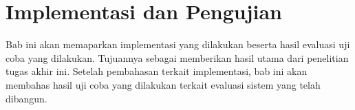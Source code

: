 \chapter{Implementasi dan Pengujian}
\label{chapter:implementasi-dan-pengujian}
Bab ini akan memaparkan implementasi yang dilakukan beserta hasil evaluasi uji coba yang dilakukan. Tujuannya sebagai memberikan hasil utama dari penelitian tugas akhir ini. Setelah pembahasan terkait implementasi, bab ini akan membahas hasil uji coba yang dilakukan terkait evaluasi sistem yang telah dibangun.





